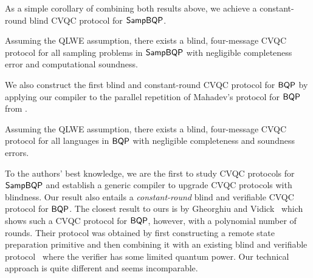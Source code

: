 


As a simple corollary of combining both results above, we achieve a constant-round blind CVQC protocol for $\operatorname{\mathsf{SampBQP}}$. %
\begin{theorem}[informal]
        Assuming the QLWE assumption, there exists a blind, four-message CVQC protocol for all sampling problems in $\operatorname{\mathsf{SampBQP}}$ with negligible completeness error and computational soundness.
\end{theorem}

We also construct the first blind and constant-round CVQC protocol for $\operatorname{\mathsf{BQP}}$ by applying our compiler to the parallel repetition of Mahadev's protocol for $\operatorname{\mathsf{BQP}}$ from \cite{arXiv:ChiaChungYam19, arXiv:AlaChiHun19}.


\begin{theorem}[informal]
    Assuming the QLWE assumption, there exists a blind, four-message CVQC protocol for all languages in $\operatorname{\mathsf{BQP}}$ with negligible completeness and soundness errors.
\end{theorem}




To the authors' best knowledge, we are the first to study CVQC protocols for $\operatorname{\mathsf{SampBQP}}$ and establish a generic compiler to upgrade CVQC protocols with blindness.
Our result also entails a \emph{constant-round} blind and verifiable CVQC protocol for $\operatorname{\mathsf{BQP}}$.
The closest result to ours is by Gheorghiu and Vidick~\cite{FOCS:GheVid19} which shows such a CVQC protocol for $\operatorname{\mathsf{BQP}}$, however, with a polynomial number of rounds.
Their protocol was obtained by first constructing a remote state preparation primitive and then combining it with an existing blind and verifiable protocol~\cite{FK17} where the verifier has some limited quantum power.
Our technical approach is quite different and seems incomparable.


